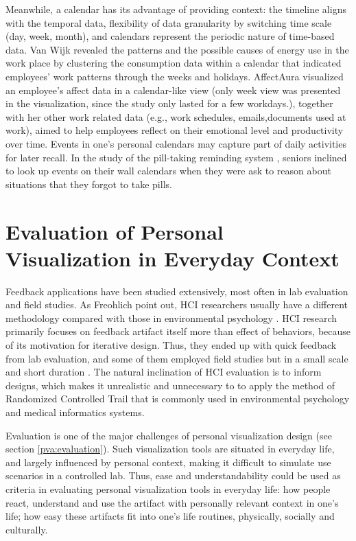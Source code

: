 \documentclass[12pt,oneside]{book}
\begin{document}
Meanwhile, a calendar has its advantage of providing context: the timeline aligns with the temporal data, flexibility of data granularity by switching time scale (day, week, month), and calendars represent the periodic nature of time-based data.  Van Wijk\cite{van_wijk_cluster_1999} revealed the patterns and the possible causes of energy use in the work place by clustering the consumption data within a calendar  that indicated employees' work patterns through the weeks and holidays. AffectAura\cite{mcduff_affectaura:_2012} visualized an employee's affect data in a calendar-like view (only week view was presented in the visualization, since the study only lasted for a few workdays.), together with her other work related data (e.g., work schedules, emails,documents used at work), aimed to help employees reflect on their emotional level and productivity over time.  Events in one's personal calendars may capture part of daily activities for later recall.  In the study of the pill-taking reminding system \cite{lee_reflecting_2011}, seniors inclined to look up events on their wall calendars when they were ask to reason about situations that they forgot to take pills.

\section{Evaluation of Personal Visualization in Everyday Context}
\label{section:relatedWork:evaluation}
Feedback applications have been studied extensively, most often in lab evaluation and field studies.  As Freohlich point out, HCI researchers usually have a different methodology compared with those in environmental psychology \cite{froehlich_design_2010,abrahamse_review_2005}.  HCI research primarily focuses on feedback artifact itself more than effect of behaviors, because of its motivation for iterative design.  Thus, they ended up with quick feedback from lab evaluation, and some of them employed field studies but in a small scale and short duration \cite{froehlich_design_2010}.  The natural inclination of HCI evaluation is to inform designs, which makes it unrealistic and unnecessary to to apply the method of Randomized Controlled Trail that is commonly used in environmental psychology and medical informatics systems.

Evaluation is one of the major challenges of personal visualization design (see section \ref{pva:evaluation}).  Such visualization tools are situated in everyday life, and largely influenced by personal context, making it difficult to simulate use scenarios in a controlled lab.  Thus, ease and understandability could be used as criteria in evaluating personal visualization tools in everyday life: how people react, understand and use the artifact with personally relevant context in one's life; how easy these artifacts fit into one's life routines, physically, socially and culturally.
\end{document}
